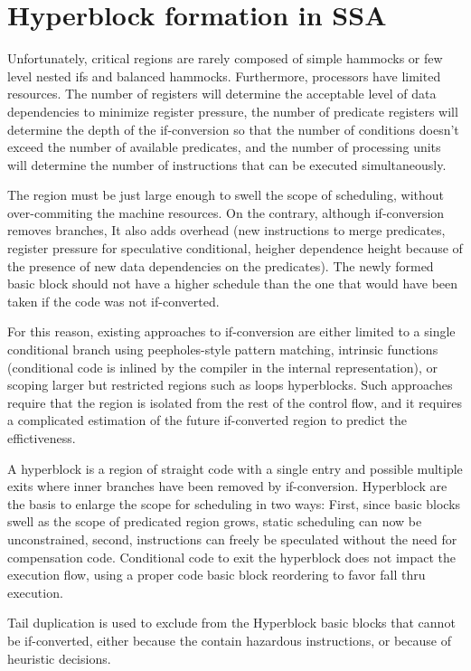 \section{Hyperblock formation in SSA}

Unfortunately, critical regions are rarely composed of simple hammocks or few level nested ifs and balanced hammocks. Furthermore, processors have limited resources. The number of registers will determine the acceptable level of data dependencies to minimize register pressure, the number of predicate registers will determine the depth of the if-conversion so that the number of conditions doesn't exceed the number of available predicates, and the number of processing units will determine the number of instructions that can be executed simultaneously.

The region must be just large enough to swell the scope of scheduling, without over-commiting the machine resources. On the contrary, although if-conversion removes branches, It also adds overhead (new instructions to merge predicates, register pressure for speculative conditional, heigher dependence height because of the presence of new data dependencies on the predicates). The newly formed basic block should not have a higher schedule than the one that would have been taken if the code was not if-converted.

For this reason, existing approaches to if-conversion are either limited to a single conditional branch using peepholes-style pattern matching, intrinsic functions (conditional code is inlined by the compiler in the internal representation), or scoping larger but restricted regions such as loops hyperblocks. Such approaches require that the region is isolated from the rest of the control flow, and it requires a complicated estimation of the future if-converted region to predict the effictiveness.

A hyperblock \cite{Mahlke:1992:ECS:144965.144998} is a region of straight code with a single entry and possible multiple exits where inner branches have been removed by if-conversion.
Hyperblock are the basis to enlarge the scope for scheduling in two ways: First, since basic blocks swell as the scope of predicated region grows, static scheduling can now be unconstrained, second, instructions can freely be speculated without the need for compensation code. Conditional code to exit the hyperblock does not impact the execution flow, using a proper code basic block reordering to favor fall thru execution.

Tail duplication is used to exclude from the Hyperblock basic blocks that cannot be if-converted, either because the contain hazardous instructions, or because of heuristic decisions.

